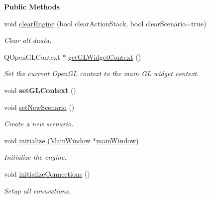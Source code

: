 \begin{Indent}\textbf{ Public Methods}\par
\begin{DoxyCompactItemize}
\item 
\mbox{\label{classrev_1_1_core_engine_a3ae4f76452acebdbbbdf588990b70c27}} 
void \mbox{\hyperlink{classrev_1_1_core_engine_a3ae4f76452acebdbbbdf588990b70c27}{clear\+Engine}} (bool clear\+Action\+Stack, bool clear\+Scenario=true)
\begin{DoxyCompactList}\small\item\em Clear all daata. \end{DoxyCompactList}\item 
Q\+Open\+G\+L\+Context $\ast$ \mbox{\hyperlink{classrev_1_1_core_engine_a8963c3b3c0ef876d3ba0ba2d79714f87}{get\+G\+L\+Widget\+Context}} ()
\begin{DoxyCompactList}\small\item\em Set the current Open\+GL context to the main GL widget context. \end{DoxyCompactList}\item 
\mbox{\label{classrev_1_1_core_engine_ace35f1b28b25fd2c0768298ef1a6066e}} 
void {\bfseries set\+G\+L\+Context} ()
\item 
\mbox{\label{classrev_1_1_core_engine_a87d7e63e422ecb6a322db71068458367}} 
void \mbox{\hyperlink{classrev_1_1_core_engine_a87d7e63e422ecb6a322db71068458367}{set\+New\+Scenario}} ()
\begin{DoxyCompactList}\small\item\em Create a new scenario. \end{DoxyCompactList}\item 
\mbox{\label{classrev_1_1_core_engine_ab9809753678807b17a7fe2e9c59b3b3d}} 
void \mbox{\hyperlink{classrev_1_1_core_engine_ab9809753678807b17a7fe2e9c59b3b3d}{initialize}} (\mbox{\hyperlink{classrev_1_1_main_window}{Main\+Window}} $\ast$\mbox{\hyperlink{classrev_1_1_core_engine_a85af90d9ccdd477eaffe5ad9f0b6ed2f}{main\+Window}})
\begin{DoxyCompactList}\small\item\em Initialize the engine. \end{DoxyCompactList}\item 
\mbox{\label{classrev_1_1_core_engine_a970218b2b8ff7e273401eef5c2b68626}} 
void \mbox{\hyperlink{classrev_1_1_core_engine_a970218b2b8ff7e273401eef5c2b68626}{initialize\+Connections}} ()
\begin{DoxyCompactList}\small\item\em Setup all connections. \end{DoxyCompactList}\end{DoxyCompactItemize}
\end{Indent}
